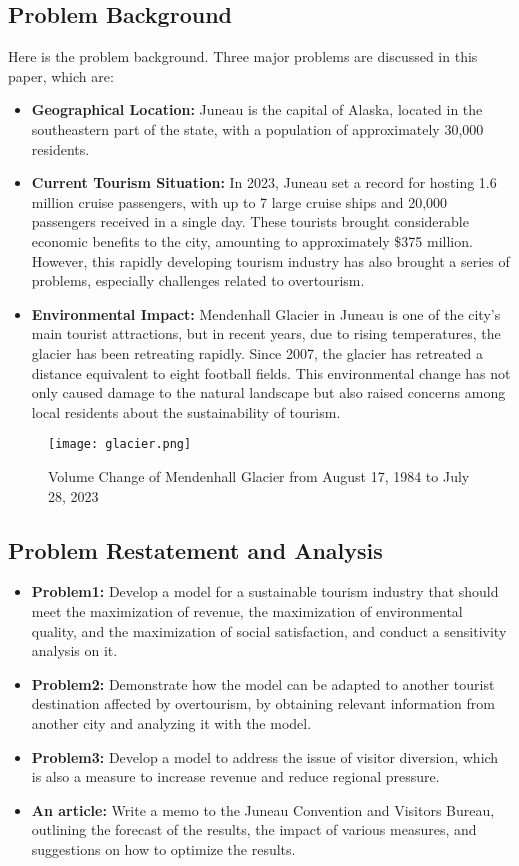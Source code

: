 \documentclass[12pt]{article}  %
\begin{document}
\subsection{Problem Background}
Here is the problem background. Three major problems are discussed in this paper, which are:
\begin{itemize}
    \item \textbf{Geographical Location: }Juneau is the capital of Alaska, located in the southeastern part of the state, with a population of approximately 30,000 residents. 
    \item \textbf{Current Tourism Situation: }In 2023, Juneau set a record for hosting 1.6 million cruise passengers, with up to 7 large cruise ships and 20,000 passengers received in a single day.\cite{1} These tourists brought considerable economic benefits to the city, amounting to approximately \$375 million.\cite{2} However, this rapidly developing tourism industry has also brought a series of problems, especially challenges related to overtourism.
    \item \textbf{Environmental Impact: }Mendenhall Glacier in Juneau is one of the city's main tourist attractions, but in recent years, due to rising temperatures, the glacier has been retreating rapidly. Since 2007, the glacier has retreated a distance equivalent to eight football fields. This environmental change has not only caused damage to the natural landscape but also raised concerns among local residents about the sustainability of tourism.\cite{3}
\end{itemize}

\begin{figure}[H]
	\centering
	\texttt{[image: glacier.png]}
	\caption{Volume Change of Mendenhall Glacier from August 17, 1984 to July 28, 2023}\label{fig:glacier}
\end{figure}

\subsection{Problem Restatement and Analysis}
\begin{itemize}
    \item \textbf{Problem1: }Develop a model for a sustainable tourism industry that should meet the maximization of revenue, the maximization of environmental quality, and the maximization of social satisfaction, and conduct a sensitivity analysis on it.
    \item \textbf{Problem2: }Demonstrate how the model can be adapted to another tourist destination affected by overtourism, by obtaining relevant information from another city and analyzing it with the model.
    \item \textbf{Problem3: }Develop a model to address the issue of visitor diversion, which is also a measure to increase revenue and reduce regional pressure.
    \item \textbf{An article: }Write a memo to the Juneau Convention and Visitors Bureau, outlining the forecast of the results, the impact of various measures, and suggestions on how to optimize the results.
\end{itemize}
\end{document}
